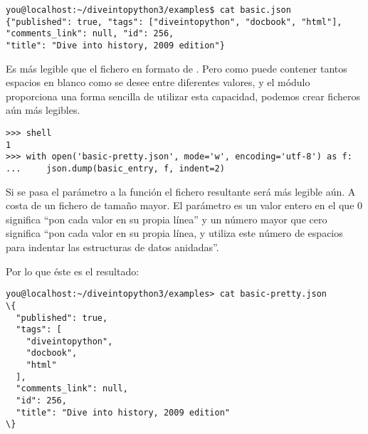 \begin{latexonly}
\noindent\begin{minipage}{\textwidth}
\begin{lstlisting}[mathescape=False]
you@localhost:~/diveintopython3/examples$ cat basic.json
{"published": true, "tags": ["diveintopython", "docbook", "html"],
"comments_link": null, "id": 256,
"title": "Dive into history, 2009 edition"}
\end{lstlisting}
\end{minipage}
\end{latexonly}

Es más legible que el fichero en formato de . Pero como  puede contener tantos espacios en blanco como se desee entre diferentes valores, y el módulo  proporciona una forma sencilla de utilizar esta capacidad, podemos crear ficheros  aún más legibles.

\noindent\begin{minipage}{\textwidth}
\begin{lstlisting}[mathescape=False]
>>> shell
1
>>> with open('basic-pretty.json', mode='w', encoding='utf-8') as f:
...     json.dump(basic_entry, f, indent=2) 
\end{lstlisting}
\end{minipage}

Si se pasa el parámetro  a la función  el fichero  resultante será más legible aún. A costa de un fichero de tamaño mayor. El parámetro  es un valor entero en el que 0 significa ``pon cada valor en su propia línea'' y un número mayor que cero significa ``pon cada valor en su propia línea, y utiliza este número de espacios para indentar las estructuras de datos anidadas''.

Por lo que éste es el resultado:

\begin{htmlonly}
\noindent\begin{minipage}{\textwidth}
\begin{lstlisting}[mathescape=False]
you@localhost:~/diveintopython3/examples> cat basic-pretty.json
\{
  "published": true, 
  "tags": [
    "diveintopython", 
    "docbook", 
    "html"
  ], 
  "comments_link": null, 
  "id": 256, 
  "title": "Dive into history, 2009 edition"
\}
\end{lstlisting}
\end{minipage}
\end{htmlonly}

